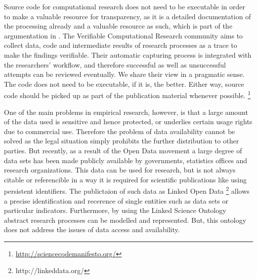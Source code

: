 \documentclass{acm_proc_article-sp}
\begin{document}
Source code for computational research does not need to be executable in order to make a valuable resource for transparency,
as it is a detailed documentation of the processing already and a valuable resource as such, which is part of the argumentation in 
%
%
\cite{gavish2011universal}.
The Verifiable Computational Research community aims to collect data, code and intermediate results of research processes as a trace to make the findings verifiable.
Their automatic capturing process is integrated with the researchers' workflow, and therefore successful as well as unsuccessful attempts can be reviewed eventually. 
We share their view in a pragmatic sense. The code does not need to be executable, if it is, the better. %
Either way, source code should be picked up as part of the publication material whenever possible.
%
%
%
\cite{barnes2012science}\footnote{\url{http://sciencecodemanifesto.org/}}




One of the main problems in empirical research, however, is that a large amount of the data used is sensitive and hence protected, or underlies certain usage rights due to commercial use. %
Therefore the problem of data availability cannot be solved as the legal situation simply prohibits the further distribution to other parties.
But recently, as a result of the Open Data movement a large degree of data sets has been made publicly available by governments, statistics offices and research organizations. This data can be used for research, but is not always citable or referencible in a way it is required for scientific publications like using persistent identifiers. The publictaion of such data as Linked Open Data \footnote{http://linkeddata.org/} allows a precise identification and recerence of single entities such as data sets or particular indicators. Furthermore, by using the Linked Science Ontology \cite{kauppinen_et_al_linked_science_2011} abstract research processes can be modelled and represented. But, this ontology does not address the issues of data access and availability.
\end{document}

